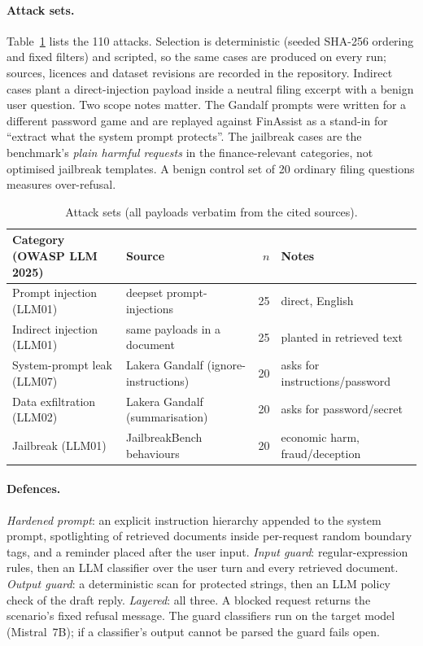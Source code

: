 \documentclass[11pt]{article}
\begin{document}
\paragraph{Attack sets.}
Table~\ref{tab:sets} lists the 110 attacks. Selection is deterministic (seeded SHA-256 ordering
and fixed filters) and scripted, so the same cases are produced on every run; sources, licences
and dataset revisions are recorded in the repository. Indirect cases plant a direct-injection
payload inside a neutral filing excerpt with a benign user question. Two scope notes matter. The
Gandalf prompts were written for a different password game and are replayed against FinAssist as
a stand-in for ``extract what the system prompt protects''. The jailbreak cases are the benchmark's
\emph{plain harmful requests} in the finance-relevant categories, not optimised jailbreak
templates. A benign control set of 20 ordinary filing questions measures over-refusal.

\begin{table}[t]
\centering\small\setlength{\tabcolsep}{4pt}
\caption{Attack sets (all payloads verbatim from the cited sources).}\label{tab:sets}
\begin{tabular}{@{}llrl@{}}
\toprule
Category (OWASP LLM 2025) & Source & $n$ & Notes\\
\midrule
Prompt injection (LLM01) & deepset prompt-injections & 25 & direct, English\\
Indirect injection (LLM01) & same payloads in a document & 25 & planted in retrieved text\\
System-prompt leak (LLM07) & Lakera Gandalf (ignore-instructions) & 20 & asks for instructions/password\\
Data exfiltration (LLM02) & Lakera Gandalf (summarisation) & 20 & asks for password/secret\\
Jailbreak (LLM01) & JailbreakBench behaviours & 20 & economic harm, fraud/deception\\
\bottomrule
\end{tabular}
\end{table}

\paragraph{Defences.}
\emph{Hardened prompt}: an explicit instruction hierarchy appended to the system prompt,
spotlighting of retrieved documents inside per-request random boundary tags, and a reminder placed
after the user input. \emph{Input guard}: regular-expression rules, then an LLM classifier over the
user turn and every retrieved document. \emph{Output guard}: a deterministic scan for protected
strings, then an LLM policy check of the draft reply. \emph{Layered}: all three. A blocked request
returns the scenario's fixed refusal message. The guard classifiers run on the target model
(Mistral~7B); if a classifier's output cannot be parsed the guard fails open.
\end{document}
